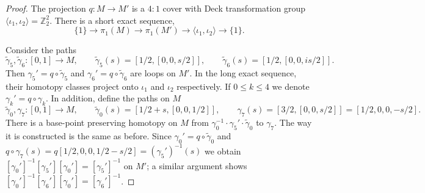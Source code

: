 \documentclass[10pt]{article}
\newcommand{\Z}{\mathbb Z}
\newcommand{\la}{\langle}
\newcommand{\ra}{\rangle}
\theoremstyle{plain}
\theoremstyle{definition}
\theoremstyle{remark}
\begin{document}
\begin{proof}
The projection $q\colon M\to M'$ is a $4:1$ cover with Deck transformation group $\la \iota_1,\iota_2\ra = \Z_2^2$.  There is a short exact sequence,
$$
\{1\} \to \pi_1(M) \to  \pi_1(M') \to \la \iota_1,\iota_2 \ra \to \{1\}.
$$

Consider the paths 
$$\widetilde{\gamma}_{5}, \widetilde{\gamma}_{6}\colon [0,1]\to M, \qquad 
\widetilde{\gamma}_{5}(s)=[1/2,[0,0,s/2]]
,\qquad
\widetilde{\gamma}_{6}(s)=[1/2,[0,0,is/2]].
$$
Then $\gamma_5'=q \circ \widetilde{\gamma}_{5}$ and $\gamma_6'=q \circ \widetilde{\gamma}_{6}$ are loops on 
 $M'$. In the long exact sequence, their homotopy classes project onto $\iota_1$ and $\iota_2$ respectively.  If $0\leq k\leq 4$ we denote  $\gamma_k'=q\circ \gamma_k$. In addition, define the paths on $M$
$$
\widetilde{\gamma}_{0}, {\gamma}_7 \colon [0,1]\to M, \qquad
\widetilde{\gamma}_0(s)=[1/2 +s,[0,0,1/2]], \qquad 
{\gamma}_7(s)=[3/2,[0,0,s/2]]=[1/2,0,0,-s/2].
$$
There is a base-point preserving homotopy on $M$ from $\gamma_0^{-1} \cdot \gamma_5' \cdot \widetilde{\gamma}_0$
to ${\gamma}_7$. The way it is constructed is the same as before.
Since $\gamma_0'=q\circ \widetilde{\gamma}_0$ and $q \circ {\gamma}_7 (s)=q[1/2,0,0,1/2-s/2]= (\gamma_5')^{-1}(s)$
we obtain $[ \gamma_0']^{-1}[{\gamma}_5'][ \gamma_0']= [\gamma_5']^{-1} $ on $M'$; a similar argument shows $[\gamma_0']^{-1}[{\gamma}_6'][ \gamma_0']= [\gamma_6']^{-1} $. 


\end{proof}
\end{document}
